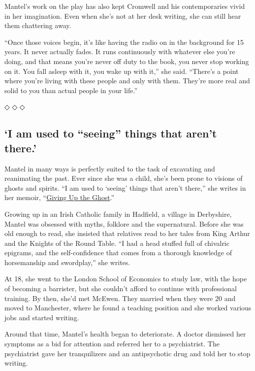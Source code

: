 Mantel's work on the play has also kept Cromwell and his contemporaries
vivid in her imagination. Even when she's not at her desk writing, she
can still hear them chattering away.

``Once those voices begin, it's like having the radio on in the
background for 15 years. It never actually fades. It runs continuously
with whatever else you're doing, and that means you're never off duty to
the book, you never stop working on it. You fall asleep with it, you
wake up with it,'' she said. ``There's a point where you're living with
these people and only with them. They're more real and solid to you than
actual people in your life.''

◇ ◇ ◇

\hypertarget{i-am-used-to-seeing-things-that-arent-there}{%
\subsection{`I am used to ``seeing'' things that aren't
there.'}\label{i-am-used-to-seeing-things-that-arent-there}}

Mantel in many ways is perfectly suited to the task of excavating and
reanimating the past. Ever since she was a child, she's been prone to
visions of ghosts and spirits. ``I am used to `seeing' things that
aren't there,'' she writes in her memoir,
``\href{https://www.nytimes.com/2003/10/05/books/unsuited-to-everything.html}{Giving
Up the Ghost}.''

Growing up in an Irish Catholic family in Hadfield, a village in
Derbyshire, Mantel was obsessed with myths, folklore and the
supernatural. Before she was old enough to read, she insisted that
relatives read to her tales from King Arthur and the Knights of the
Round Table. ``I had a head stuffed full of chivalric epigrams, and the
self-confidence that comes from a thorough knowledge of horsemanship and
swordplay,'' she writes.

At 18, she went to the London School of Economics to study law, with the
hope of becoming a barrister, but she couldn't afford to continue with
professional training. By then, she'd met McEwen. They married when they
were 20 and moved to Manchester, where he found a teaching position and
she worked various jobs and started writing.

Around that time, Mantel's health began to deteriorate. A doctor
dismissed her symptoms as a bid for attention and referred her to a
psychiatrist. The psychiatrist gave her tranquilizers and an
antipsychotic drug and told her to stop writing.

